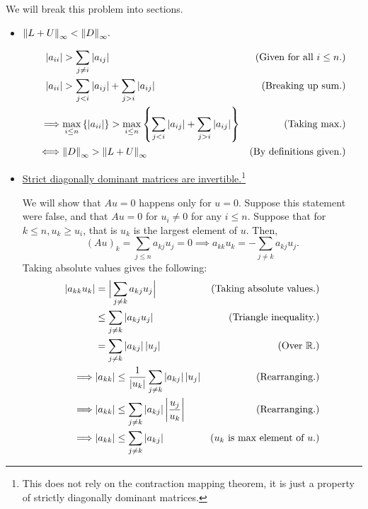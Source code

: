 \begin{solution}

    We will break this problem into sections.
    \begin{itemize}[-]
        \item \underline{$\norm{L + U}_\infty < \norm{D}_\infty.$}

        \jump
        \tightalignbreak
        \begin{align*}
            |a_{ii}| &> \sum_{j \neq i} |a_{ij}| &\text{(Given for all $ i \leq n$.)}\\
            |a_{ii}| &> \sum_{j < i} |a_{ij}| + \sum_{j > i} |a_{ij}| &\text{(Breaking up sum.)}\\
            \implies &\underset{i \leq n}{\max} \left\{ |a_{ii}| \right\} > \underset{i \leq n}{\max} \left \{ \sum_{j < i} |a_{ij}| + \sum_{j > i} |a_{ij}| \right\} &\text{(Taking max.)}\\
            \iff & \norm{D}_\infty > \norm{L + U}_{\infty} &\text{(By definitions given.)}
        \end{align*}
        \vspace{-6mm}\alignbreak

        \newpage
        \item \underline{Strict diagonally dominant matrices are invertible.}\footnote{This does not rely on the contraction mapping theorem, it is just a property of strictly diagonally dominant matrices.}

        \jump
        We will show that $Au = 0$ happens only for $u = 0$. Suppose this statement were false, and that $Au = 0$ for $u_i \neq 0$ for any $i \leq n$. Suppose that for $k \leq n, u_k \geq u_i$, that is $u_k$ is the largest element of $u$. Then,
        \[ (Au)_k = \sum_{j \leq n} a_{kj}u_j = 0 \implies  a_{kk}u_k = -\sum_{j \neq k} a_{kj}u_j.\]
        Taking absolute values gives the following:
        \tightalignbreak
        \begin{align*}
        |a_{kk}u_k| &= \Big| \sum_{j \neq k} a_{kj}u_j\Big| &\text{(Taking absolute values.)}\\
        &\leq \sum_{j \neq k}\left| a_{kj} u_j\right| &\text{(Triangle inequality.)}\\
        &= \sum_{j \neq k}\left| a_{kj} \right| \left|u_j\right| &\text{(Over $\mathbb{R}$.)}\\
        \implies & |a_{kk}| \leq \frac{1}{|u_k|}\sum_{j \neq k}\left| a_{kj} \right| \left|u_j\right| &\text{(Rearranging.)}\\
        \implies & |a_{kk}| \leq \sum_{j \neq k}\left| a_{kj} \right| \left|\frac{u_j}{u_k}\right| &\text{(Rearranging.)}\\
        \implies & |a_{kk}| \leq \sum_{j \neq k}\left| a_{kj} \right| &\text{($u_k$ is max element of $u$.)}
        \end{align*}
        \vspace{-6mm}\alignbreak
        

\end{itemize}
\end{solution}

